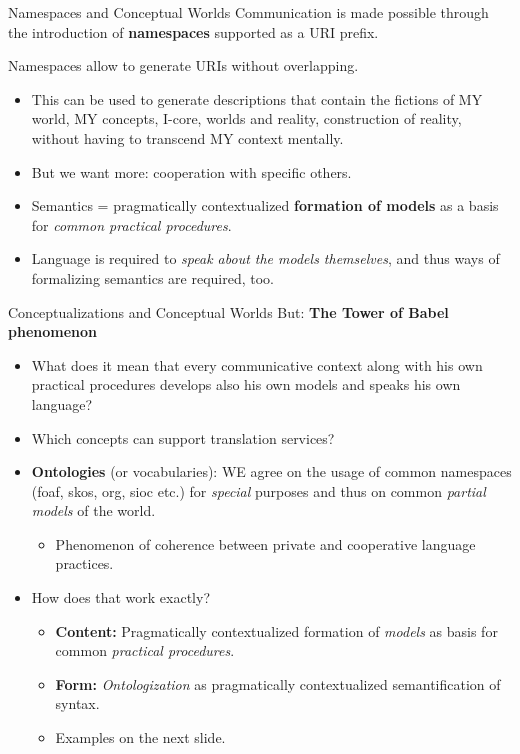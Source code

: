 \documentclass{beamer}
\begin{document}
\begin{frame}{Namespaces and Conceptual Worlds}
Communication is made possible through the introduction of \textbf{namespaces}
supported as a URI prefix.

Namespaces allow to generate URIs without overlapping.
\begin{itemize}
\item This can be used to generate descriptions that contain the fictions of
  MY world, MY concepts, I-core, worlds and reality, construction of reality,
  without having to transcend MY context mentally.
\item But we want more: cooperation with specific others.
\item Semantics = pragmatically contextualized \textbf{formation of models} as
  a basis for \emph{common practical procedures}.
\item Language is required to \emph{speak about the models themselves},
  and thus ways of formalizing semantics are required, too.
\end{itemize}
\end{frame}

\begin{frame}{Conceptualizations and Conceptual Worlds}
But: \textbf{The Tower of Babel phenomenon}
\begin{itemize}
\item What does it mean that every communicative context along with his own
  practical procedures develops also his own models and speaks his own
  language?
\item Which concepts can support translation services?
\item \textbf{Ontologies} (or vocabularies): WE agree on the usage of common
  namespaces (foaf, skos, org, sioc etc.) for \emph{special} purposes and thus
  on common \emph{partial models} of the world.
  \begin{itemize}
  \item Phenomenon of coherence between private and cooperative language
    practices.
  \end{itemize}
\item How does that work exactly?
  \begin{itemize}
  \item \textbf{Content:} Pragmatically contextualized formation of
    \emph{models} as basis for common \emph{practical procedures}.
  \item \textbf{Form:} \emph{Ontologization} as pragmatically contextualized
    semantification of syntax.
  \item Examples on the next slide.
  \end{itemize}
\end{itemize}
\end{frame}
\end{document}
